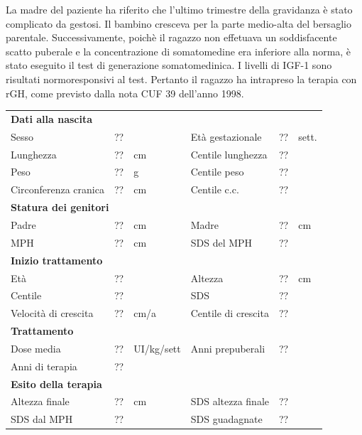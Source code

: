 La madre del paziente ha riferito che l'ultimo trimestre della gravidanza è stato complicato da gestosi. Il bambino cresceva per la parte medio-alta del bersaglio parentale. Successivamente, poichè il ragazzo non effetuava un soddisfacente scatto puberale e la concentrazione di somatomedine era inferiore alla norma, è stato eseguito il test di generazione somatomedinica. I livelli di IGF-1 sono risultati normoresponsivi al test. Pertanto il ragazzo ha intrapreso la terapia con rGH, come previsto dalla nota CUF 39 dell'anno 1998.
\begin{table}[!h]
\begin{tabular}{lrllrl}
\toprule
\multicolumn{6}{l}{\textbf{Dati alla nascita}}\\
Sesso 		& \multicolumn{2}{l}{??} 	& Età gestazionale 		& ?? 		& sett.\\
Lunghezza 	& ?? 		& cm 				& Centile lunghezza		& ?? 		\\
Peso 		& ?? 		& g					& Centile peso			& ?? 		\\
Circonferenza cranica	& ?? 		& cm 	& Centile c.c.			& ?? \\
\midrule
\multicolumn{6}{l}{\textbf{Statura dei genitori}}\\
Padre 		& ?? & cm 	& Madre 				& ?? & cm \\
MPH 		& ?? & cm 	& SDS del MPH 			& ??\\
\midrule
\multicolumn{6}{l}{\textbf{Inizio trattamento}} \\
Età	& ?? & 		& Altezza 				& ?? & cm  \\
Centile & ?? 	 &		& SDS		& ?? \\
Velocità di crescita & ?? & cm/a	& Centile di crescita & ??\\
\midrule
\multicolumn{6}{l}{\textbf{Trattamento}} \\
Dose media		& ?? & UI/kg/sett & Anni prepuberali & ??\\
Anni di terapia & ??\\
\midrule
\multicolumn{6}{l}{\textbf{Esito della terapia}} \\
Altezza finale			& ?? & cm 	& SDS altezza finale		& ??\\
SDS dal MPH				& ?? &		& SDS guadagnate 			& ??\\
\bottomrule
\end{tabular}
\end{table}
\clearpage


